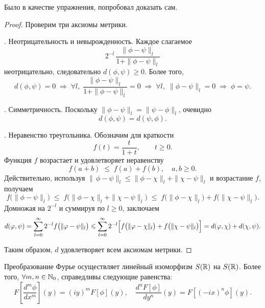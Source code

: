 \begin{note}
    Было в качестве упражнения, попробовал доказать сам.
\end{note}
\begin{proof}
    Проверим три аксиомы метрики.

    \medskip
    . Неотрицательность и невырожденность.
    Каждое слагаемое
    \[
        2^{-l}\,\frac{\|\phi-\psi\|_l}{1+\|\phi-\psi\|_l}
    \]
    неотрицательно, следовательно $d(\phi,\psi)\ge0$. Более того,
    \[
        d(\phi,\psi)=0
        \;\Longrightarrow\;
        \forall l,\;\frac{\|\phi-\psi\|_l}{1+\|\phi-\psi\|_l}=0
        \;\Longrightarrow\;
        \forall l,\;\|\phi-\psi\|_l=0
        \;\Longrightarrow\;
        \phi=\psi.
    \]

    \medskip
    . Симметричность.
    Поскольку $\|\phi-\psi\|_l=\|\psi-\phi\|_l$, очевидно
    \[
        d(\phi,\psi)=d(\psi,\phi).
    \]

    \medskip
    . Неравенство треугольника.
    Обозначим для краткости
    \[
        f(t)=\frac{t}{1+t},\qquad t\ge0.
    \]
    Функция $f$ возрастает и удовлетворяет неравенству
    \[
        f(a+b)\;\le\;f(a)+f(b),
        \quad a,b\ge0.
    \]
    Действительно, используя
    \(\|\,\phi-\psi\|_l\le\|\phi-\chi\|_l+\|\chi-\psi\|_l\) и возрастание $f$, получаем
    \[
        f\bigl(\|\phi-\psi\|_l\bigr)
        \;\le\;
        f\bigl(\|\phi-\chi\|_l+\|\chi-\psi\|_l\bigr)
        \;\le\;
        f\bigl(\|\phi-\chi\|_l\bigr)
        +f\bigl(\|\chi-\psi\|_l\bigr).
    \]
    Домножая на $2^{-l}$ и суммируя по $l\ge0$, заключаем
    \[
        d(\phi,\psi)
        =\sum_{l=0}^\infty2^{-l}f\bigl(\|\phi-\psi\|_l\bigr)
        \le
        \sum_{l=0}^\infty2^{-l}\Bigl[f\bigl(\|\phi-\chi\|_l\bigr)
        +f\bigl(\|\chi-\psi\|_l\bigr)\Bigr]
        =d(\phi,\chi)+d(\chi,\psi).
    \]

    Таким образом, $d$ удовлетворяет всем аксиомам метрики.
\end{proof}
\begin{theorem}
    Преобразование Фурье осуществляет линейный изоморфизм $S(\R)$ на $S(\R)$.
    Более того, $\forall m, n \in \N_0$, справедливы следующие равенства:
    \[
        F\left[\dfrac{d^m \phi}{dx^m}\right](y) = (iy)^m F[\phi](y), \quad \dfrac{d^n F[\phi]}{dy^n}(y) = F[(-ix)^n \phi](y).
    \]
\end{theorem}
